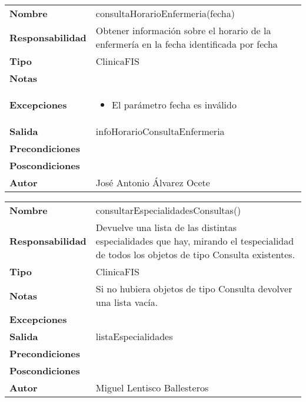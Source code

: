 \documentclass[11pt,a4paper]{article}
\newenvironment{itemizenomargins}
    {\begin{minipage}[t]{1\linewidth}\begin{itemize}}
    {\end{itemize}\end{minipage}}
\begin{document}
\begin{table}[H]
	\centering
	\label{my-label}
	\begin{tabularx}{\textwidth}{l|X}
		\textbf{Nombre}          & consultaHorarioEnfermeria(fecha) \\
		\textbf{Responsabilidad} & Obtener información sobre el horario de la enfermería en la fecha identificada por fecha \\
		\textbf{Tipo}            & ClinicaFIS \\
		\textbf{Notas}           &  \\
		\textbf{Excepciones}     & 
		\begin{itemizenomargins}
			\item El parámetro fecha es inválido
		\end{itemizenomargins}\\
		\textbf{Salida}          & infoHorarioConsultaEnfermeria\\
		\textbf{Precondiciones}  & \\
		\textbf{Poscondiciones}  & \\
		\textbf{Autor}           & José Antonio Álvarez Ocete
	\end{tabularx}
\end{table}

\begin{table}[H]
	\centering
	\label{my-label}
	\begin{tabularx}{\textwidth}{l|X}
		\textbf{Nombre}          & consultarEspecialidadesConsultas() \\
		\textbf{Responsabilidad} & Devuelve una lista de las distintas especialidades que hay, mirando el  tespecialidad de todos los objetos de tipo Consulta existentes.\\
		\textbf{Tipo}            & ClinicaFIS \\
		\textbf{Notas}           & Si no hubiera objetos de tipo Consulta devolver una lista vacía. \\
		\textbf{Excepciones}     &  \\
		\textbf{Salida}          &  listaEspecialidades \\
		\textbf{Precondiciones}  &  \\
		\textbf{Poscondiciones}  &  \\
		\textbf{Autor}			 & Miguel Lentisco Ballesteros
	\end{tabularx}
\end{table}
\end{document}

